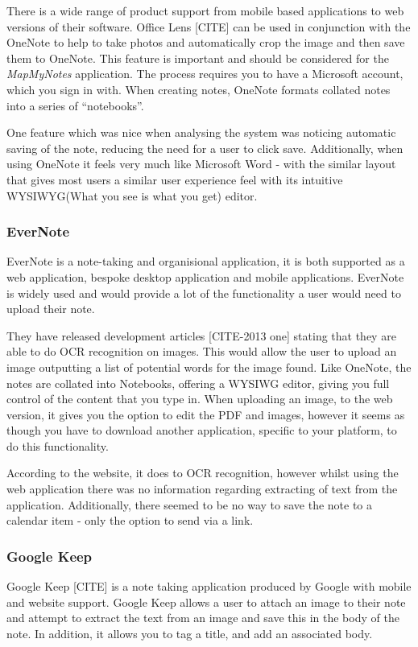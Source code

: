 There is a wide range of product support from mobile based applications to web versions of their software. Office Lens [CITE] can be used in conjunction with the OneNote to help to take photos and automatically crop the image and then save them to OneNote. This feature is important and should be considered for the \textit{MapMyNotes} application. The process requires you to have a Microsoft account, which you sign in with. When creating notes, OneNote formats collated notes into a series of ``notebooks''.

One feature which was nice when analysing the system was noticing automatic saving of the note, reducing the need for a user to click save. Additionally, when using OneNote it feels very much like Microsoft Word - with the similar layout that gives most users a similar user experience feel with its intuitive WYSIWYG(What you see is what you get) editor.

\subsubsection{EverNote}
EverNote is a note-taking and organisional application, it is both supported as a web application, bespoke desktop application and mobile applications. EverNote is widely used and would provide a lot of the functionality a user would need to upload their note.

They have released development articles [CITE-2013 one] stating that they are able to do OCR recognition on images. This would allow the user to upload an image outputting a list of potential words for the image found. Like OneNote, the notes are collated into Notebooks, offering a WYSIWG editor, giving you full control of the content that you type in. When uploading an image, to the web version, it gives you the option to edit the PDF and images, however it seems as though you have to download another application, specific to your platform,  to do this functionality.

According to the website, it does to OCR recognition, however whilst using the web application there was no information regarding extracting of text from the application. Additionally, there seemed to be no way to save the note to a calendar item - only the option to send via a link.

\subsubsection{Google Keep}
Google Keep [CITE] is a note taking application produced by Google with mobile and website support. Google Keep allows a user to attach an image to their note and attempt to extract the text from an image and save this in the body of the note. In addition, it allows you to tag a title, and add an associated body.


